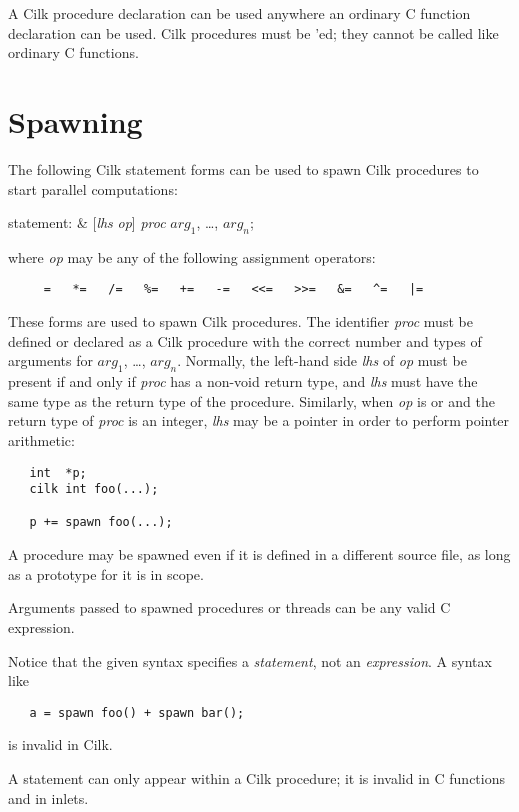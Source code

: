 A Cilk procedure declaration can be used anywhere an ordinary C
function declaration can be used. Cilk procedures must be
'ed; they cannot be called like ordinary C functions.

\section{Spawning}
\label{sec:lanref:spawn-sec}

The following Cilk statement forms can be used to spawn Cilk
procedures to start parallel computations:
\begin{syntax}
statement{\rm :} & {\rm [}\textit{lhs} \textit{op}{\rm ]}  \textit{proc}
        \cilkkw{(}$\textit{arg}_1$, \dots, $\textit{arg}_n$\cilkkw{)};
\end{syntax}
where \textit{op} may be any of the following assignment operators:
\begin{verbatim}
     =   *=   /=   %=   +=   -=   <<=   >>=   &=   ^=   |= 
\end{verbatim}
These forms are used to spawn Cilk procedures.  The identifier
\textit{proc} must be defined or declared as a Cilk procedure with the
correct number and types of arguments for $\textit{arg}_1$, \dots,
$\textit{arg}_n$.  Normally, the left-hand side \textit{lhs} of
\textit{op} must be present if and only if \textit{proc} has a
non-void return type, and \textit{lhs} must have the same type as the
return type of the procedure.  Similarly, when \textit{op} is
\cilkkw{+=} or \cilkkw{-=} and the return type of \textit{proc} is an
integer, \textit{lhs} may be a pointer in order to perform pointer
arithmetic:
\begin{verbatim}
   int  *p;
   cilk int foo(...);

   p += spawn foo(...);
\end{verbatim}

A procedure may be spawned even if it is defined in a different source
file, as long as a prototype for it is in scope.

Arguments passed to spawned procedures or threads can be any valid C
expression.

Notice that the given syntax specifies a \textit{statement}, not an
\textit{expression}.  A syntax like
\begin{verbatim}
   a = spawn foo() + spawn bar();
\end{verbatim}
is invalid in Cilk.

A  statement can only appear within a Cilk procedure;
it is invalid in C functions and in inlets.

